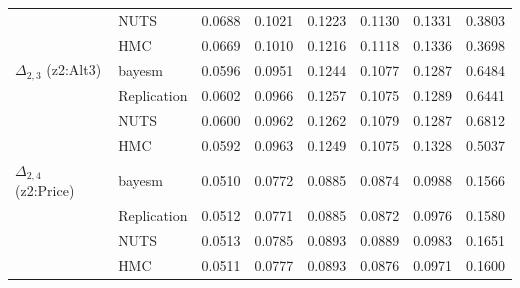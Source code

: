 \begin{tabular}{llcccccc}
 & NUTS & 0.0688 & 0.1021 & 0.1223 & 0.1130 & 0.1331 & 0.3803 \\
 & HMC & 0.0669 & 0.1010 & 0.1216 & 0.1118 & 0.1336 & 0.3698 \\
$\Delta_{2,3}$ (z2:Alt3) & bayesm & 0.0596 & 0.0951 & 0.1244 & 0.1077 & 0.1287 & 0.6484 \\
 & Replication & 0.0602 & 0.0966 & 0.1257 & 0.1075 & 0.1289 & 0.6441 \\
 & NUTS & 0.0600 & 0.0962 & 0.1262 & 0.1079 & 0.1287 & 0.6812 \\
 & HMC & 0.0592 & 0.0963 & 0.1249 & 0.1075 & 0.1328 & 0.5037 \\
$\Delta_{2,4}$ (z2:Price) & bayesm & 0.0510 & 0.0772 & 0.0885 & 0.0874 & 0.0988 & 0.1566 \\
 & Replication & 0.0512 & 0.0771 & 0.0885 & 0.0872 & 0.0976 & 0.1580 \\
 & NUTS & 0.0513 & 0.0785 & 0.0893 & 0.0889 & 0.0983 & 0.1651 \\
 & HMC & 0.0511 & 0.0777 & 0.0893 & 0.0876 & 0.0971 & 0.1600 \\
\bottomrule
\end{tabular}
